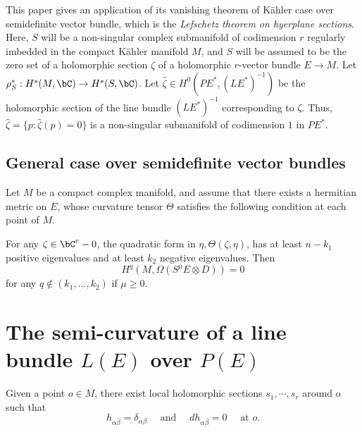 \documentclass[lang=en,12pt]{beautybook}
\begin{document}
This paper gives an application of its vanishing theorem of K\"ahler case over semidefinite vector bundle, which is the \textit{Lefschetz theorem on hyerplane sections}. Here, $S$ will be  a non-singular complex submanifold of codimension $r$ regularly imbedded in the compact K\"ahler manifold $M$, and $S$ will be assumed to be the zero set of a holomorphic section $\zeta$ of a holomorphic $r$-vector bundle $E\to M$. Let $\rho^*_S : H^s(M,\bC)\to H^s(S,\bC)$. Let $\widehat{\zeta}\in H^0(PE^*,(LE^*)^{-1})$ be the holomorphic section of the line bundle $(LE^*)^{-1}$ corresponding to $\zeta$. Thus, $\widehat{\zeta}=\{p\colon \widehat{\zeta}(p)=0\}$ is a non-singular submanifold of codimension $1$ in $PE^*$.

\subsection{General case over semidefinite vector bundles}
\begin{theorem}
  Let $M$ be a compact complex manifold, and assume that there exists a hermitian metric on $E$, whose curvature tensor $\Theta$ satisfies the following condition at each point of $M$.

  For any $\zeta\in \bC^r-0$, the quadratic form in $\eta,\Theta(\zeta,\eta)$, has at least $n-k_1$ positive eigenvalues and at least $k_2$ negative eigenvalues. Then
  \[H^q(M,\Omega(S^\mu E\otimes D))=0\]
  for any $q\not\in (k_1,\ldots,k_2)$ if $\mu\geqslant 0$.
\end{theorem}

\section{The semi-curvature of a line bundle \texorpdfstring{$L(E)$}- over \texorpdfstring{$P(E)$}-}

\begin{proposition}
  Given a point $o \in M$, there exist local holomorphic sections $s_1, \cdots, s_r$ around o such that
  \begin{equation*}
    h_{\alpha \bar{\beta}}=\delta_{\alpha \beta} \quad \text { and } \quad d h_{\alpha \bar{\beta}}=0 \quad \text { at } o .
  \end{equation*}
\end{proposition}
\end{document}
